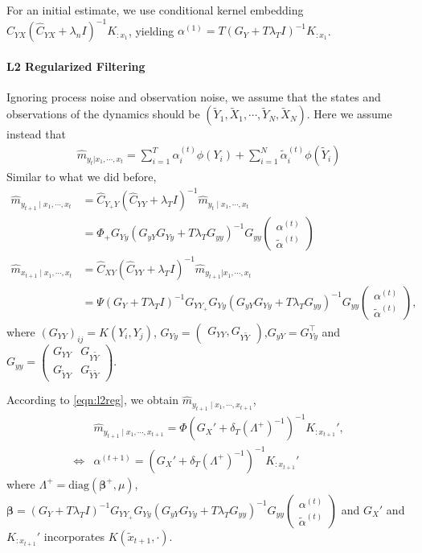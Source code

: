 \documentclass[a4paper]{article}
\newcommand{\up}{\mathrm}
\newcommand{\bs}{\boldsymbol}
\newcommand{\T}{\intercal}
\begin{document}
For an initial estimate, we use conditional kernel embedding $\widehat{C}_{YX}(\widehat{C}_{YX} + \lambda_n I)^{-1} K_{:x_1}$, yielding $\alpha^{(1)} = T(G_Y + T\lambda_T I)^{-1}K_{:x_1}$.

\paragraph{L2 Regularized Filtering}
Ignoring process noise and observation noise, we assume that the states and observations of the dynamics should be $(\tilde{Y}_1,\tilde{X}_1,\cdots,\tilde{Y}_N,\tilde{X}_N)$. Here we assume instead that 
\begin{align}
\hat{m}_{y_t|x_1,\cdots,x_t} = \sum_{i=1}^T \alpha_i^{(t)} \phi(Y_i) + \sum_{i=1}^N \tilde{\alpha}_i^{(t)} \phi(\tilde{Y}_i)
\end{align}
Similar to what we did before,
\begin{align}
\hat{m}_{y_{t+1}\mid x_1,\cdots,x_t} &= \hat{C}_{Y_{+}Y}(\hat{C}_{YY}+\lambda_T I)^{-1}\hat{m}_{y_t\mid x_1,\cdots,x_t} \\
&= \Phi_{+}G_{Yy}(G_{yY}G_{Yy} + T\lambda_T G_{yy})^{-1}G_{yy} \begin{pmatrix}
\alpha^{(t)}\\
\tilde{\alpha}^{(t)}
\end{pmatrix}\\
\hat{m}_{x_{t+1}\mid x_1,\cdots,x_t} &= \hat{C}_{XY}(\hat{C}_{YY} + \lambda_{T}I)^{-1}\hat{m}_{y_{t+1}|x_1,\cdots,x_t} \\
&= \Psi(G_{Y} + T\lambda_T I)^{-1} G_{YY_+}G_{Yy}(G_{yY}G_{Yy} + T\lambda_T G_{yy})^{-1}G_{yy} \begin{pmatrix}
\alpha^{(t)}\\
\tilde{\alpha}^{(t)}
\end{pmatrix},
\end{align}
where $(G_{YY})_{ij} = K(Y_i,Y_j)$,
$
G_{Yy} = \begin{pmatrix}
G_{YY}, G_{Y\tilde{Y}}
\end{pmatrix}
$,$G_{yY} = G_{Yy}^\T$ and $G_{yy} = \begin{pmatrix}
G_{YY} & G_{Y\tilde{Y}}\\
G_{\tilde{Y}Y} & G_{\tilde{Y}\tilde{Y}}
\end{pmatrix}$.

According to \eqref{eqn:l2reg}, we obtain $\hat{m}_{y_{t+1}\mid x_1,\cdots,x_{t+1}}$,
\begin{align}
&\hat{m}_{y_{t+1}\mid x_1,\cdots,x_{t+1}} = \Phi(G_X' + \delta_T (\Lambda^+)^{-1})^{-1} K_{:x_{t+1}}',\\
\Leftrightarrow& \alpha^{(t+1)} = (G_X' + \delta_T (\Lambda^+)^{-1})^{-1} K_{:x_{t+1}}'
\end{align}
where $\Lambda^+ = \up{diag}(\bs{\beta}^+,\mu)$, $\bs{\beta} = (G_Y + T\lambda_T I)^{-1}G_{YY_+}G_{Yy}(G_{yY}G_{Yy} + T\lambda_T G_{yy})^{-1}G_{yy} \begin{pmatrix}
\alpha^{(t)}\\
\tilde{\alpha}^{(t)}
\end{pmatrix}$ and $G_X'$ and $K_{:x_{t+1}}'$ incorporates $K(\tilde{x}_{t+1},\cdot)$.
\end{document}
